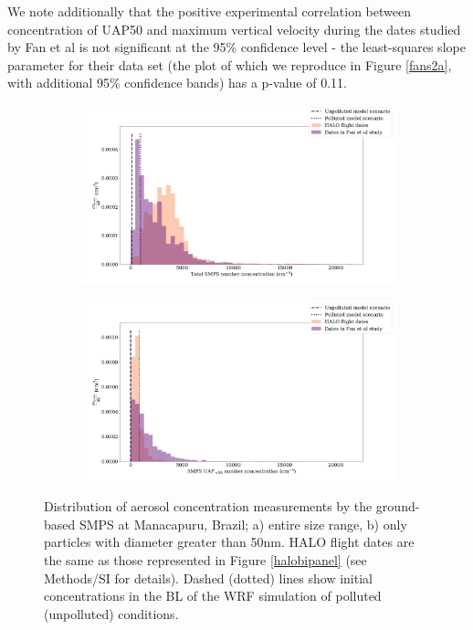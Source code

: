 \documentclass{article}
\begin{document}
We note additionally that the positive experimental correlation between concentration of UAP50 and maximum vertical velocity during the dates studied by Fan et al is not significant at the 95\% confidence level - the least-squares slope parameter for their data set (the plot of which we reproduce in Figure \ref{fans2a}, with additional 95\% confidence bands) has a p-value of 0.11.
\begin{figure}[ht]
	\centering
	\begin{subfigure}{0.7\textwidth}
		\includegraphics[width=\textwidth]{goama/v1_FINAL_tot_compare_nconc_hist_alldates_figure.png}
		\label{goamatothist}
		\caption{}
	\end{subfigure}
	\begin{subfigure}{0.7\textwidth}
		\includegraphics[width=\textwidth]{goama/v1_FINAL_uap50_compare_nconc_hist_alldates_figure.png}
		\label{goamauap50hist}
		\caption{}
	\end{subfigure}
	\caption{Distribution of aerosol concentration measurements by the ground-based SMPS at Manacapuru, Brazil; a) entire size range, b) only particles with diameter greater than 50nm. HALO flight dates are the same as those represented in Figure \ref{halobipanel} (see Methods/SI for details). Dashed (dotted) lines show initial concentrations in the BL of the WRF simulation of polluted (unpolluted) conditions.}
	\label{goamahist}
\end{figure}
\end{document}
